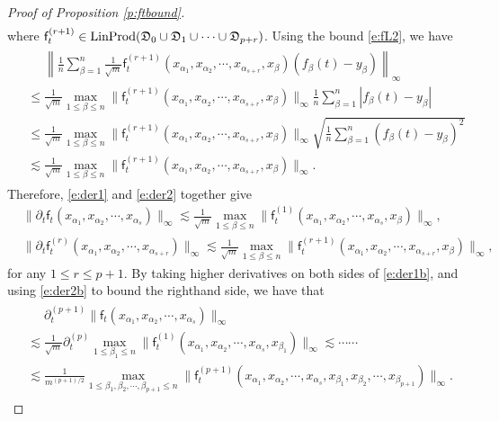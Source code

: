 \documentclass{article}
\numberwithin{equation}{section}
\newcommand{\fD}{{\frak D}}
\newcommand{\sff}{{\mathsf f}}
\newcommand{\al}{\alpha}
\renewcommand{\leq}{\leqslant}
\newcommand{\del}{\partial}
\newcommand{\1}{\mathds{1}}
\theoremstyle{plain} %
\newcommand{\LinProd}{{\rm LinProd}}
\begin{document}
\begin{proof}[Proof of Proposition \ref{p:ftbound}]
\begin{align}
\end{align}
where $\sff_t^{(r+1)}\in \LinProd(\fD_0\cup\fD_1\cup\cdots\cup \fD_{p+r})$.
Using the bound \eqref{e:fL2}, we have
\begin{align*}\begin{split}
&\phantom{{}={}}\left\|\frac{1}{n}\sum_{\beta=1}^n\frac{1}{\sqrt m}\sff_t^{(r+1)}(x_{\al_1}, x_{\al_2}, \cdots, x_{\al_{s+r}}, x_\beta)(f_\beta(t)-y_\beta)\right\|_\infty\\
&\leq 
\frac{1}{\sqrt m}\max_{1\leq \beta \leq n}\|\sff_t^{(r+1)}(x_{\al_1}, x_{\al_2}, \cdots, x_{\al_{s+r}}, x_\beta)\|_\infty\frac{1}{n}\sum_{\beta=1}^n|f_\beta(t)-y_\beta|\\
&\leq \frac{1}{\sqrt m}\max_{1\leq \beta \leq n}\|\sff_t^{(r+1)}(x_{\al_1}, x_{\al_2}, \cdots, x_{\al_{s+r}}, x_\beta)\|_\infty\sqrt{\frac{1}{n}\sum_{\beta=1}^n(f_\beta(t)-y_\beta)^2}\\
&\lesssim \frac{1}{\sqrt m}\max_{1\leq \beta \leq n}\|\sff_t^{(r+1)}(x_{\al_1}, x_{\al_2}, \cdots, x_{\al_{s+r}}, x_\beta)\|_\infty.
\end{split}\end{align*}
Therefore, \eqref{e:der1} and \eqref{e:der2} together give 
\begin{align}
\label{e:der1b}&\|\del_t\sff_t(x_{\al_1}, x_{\al_2}, \cdots,x_{\al_{s}})\|_\infty
\lesssim \frac{1}{\sqrt m}\max_{1\leq \beta \leq n}\|\sff_t^{(1)}(x_{\al_1}, x_{\al_2}, \cdots, x_{\al_{s}}, x_\beta)\|_\infty,\\
\label{e:der2b}&\|\del_t\sff_t^{(r)}(x_{\al_1}, x_{\al_2}, \cdots,x_{\al_{s+r}})\|_\infty
\lesssim \frac{1}{\sqrt m}\max_{1\leq \beta \leq n}\|\sff_t^{(r+1)}(x_{\al_1}, x_{\al_2}, \cdots, x_{\al_{s+r}}, x_\beta)\|_\infty,
\end{align}
for any $1\leq r\leq p+1$. By taking higher derivatives on both sides of \eqref{e:der1b}, and using \eqref{e:der2b} to bound the righthand side, we have that
\begin{align}\begin{split}\label{e:ftder}
&\phantom{{}={}}\del_t^{(p+1)}\|\sff_t(x_{\al_1}, x_{\al_2}, \cdots,x_{\al_{s}})\|_\infty\\
&\lesssim \frac{1}{\sqrt m}\del_t^{(p)}\max_{1\leq \beta_1\leq n}\|\sff_t^{(1)}(x_{\al_1}, x_{\al_2}, \cdots,x_{\al_{s}}, x_{\beta_1})\|_\infty\lesssim \cdots\cdots\\
&\lesssim \frac{1}{m^{(p+1)/2}}\max_{1\leq \beta_1,\beta_2,\cdots,\beta_{p+1} \leq n}\|\sff_t^{(p+1)}(x_{\al_1}, x_{\al_2}, \cdots, x_{\al_{s}}, x_{\beta_1}, x_{\beta_2},\cdots, x_{\beta_{p+1}})\|_\infty.
\end{split}\end{align}


\end{proof}
\end{document}
